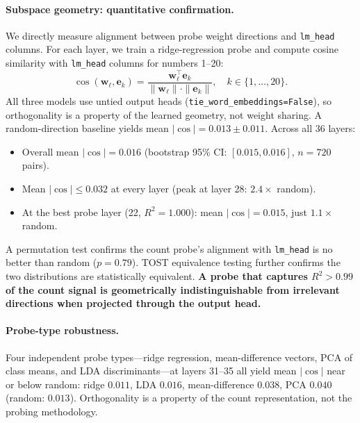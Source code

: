 \documentclass{article}
\begin{document}
\paragraph{Subspace geometry: quantitative confirmation.}
We directly measure alignment between probe weight directions and \texttt{lm\_head} columns.
For each layer, we train a ridge-regression probe and compute cosine similarity with \texttt{lm\_head} columns for numbers 1--20:
\begin{equation}
  \cos(\mathbf{w}_\ell, \mathbf{e}_k) = \frac{\mathbf{w}_\ell^\top \mathbf{e}_k}{\|\mathbf{w}_\ell\| \cdot \|\mathbf{e}_k\|},
  \quad k \in \{1, \ldots, 20\}.
\end{equation}
All three models use untied output heads (\texttt{tie\_word\_embeddings=False}), so orthogonality is a property of the learned geometry, not weight sharing.
A random-direction baseline yields mean $|\cos| = 0.013 \pm 0.011$.
Across all 36 layers:
\begin{itemize}
  \item Overall mean $|\cos| = 0.016$ (bootstrap 95\% CI: $[0.015, 0.016]$, $n{=}720$ pairs).
  \item Mean $|\cos| \leq 0.032$ at every layer (peak at layer 28: $2.4\times$ random).
  \item At the best probe layer (22, $R^2 = 1.000$): mean $|\cos| = 0.015$, just $1.1\times$ random.
\end{itemize}
A permutation test confirms the count probe's alignment with \texttt{lm\_head} is no better than random ($p = 0.79$). TOST equivalence testing further confirms the two distributions are statistically equivalent.
\textbf{A probe that captures $R^2 > 0.99$ of the count signal is geometrically indistinguishable from irrelevant directions when projected through the output head.}

\paragraph{Probe-type robustness.}
Four independent probe types---ridge regression, mean-difference vectors, PCA of class means, and LDA discriminants---at layers 31--35 all yield mean $|\cos|$ near or below random: ridge $0.011$, LDA $0.016$, mean-difference $0.038$, PCA $0.040$ (random: $0.013$).
Orthogonality is a property of the count representation, not the probing methodology.
\end{document}
